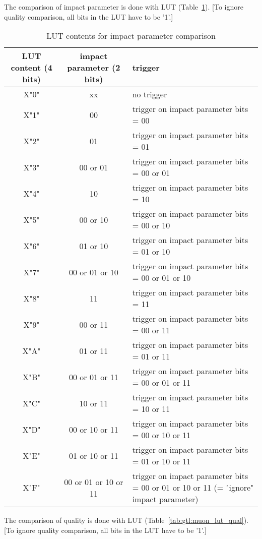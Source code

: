 The comparison of impact parameter is done with LUT (Table~\ref{tab:gtl:muon_lut_ip}). [To ignore quality comparison, all bits in the LUT have to be '1'.]

\begin{table}
\caption{LUT contents for impact parameter comparison}
\vspace{5mm}
\centering
\begin{tabular}{|c|c|p{}|}\hline
LUT content (4 bits) & impact parameter  (2 bits) & trigger \\\hline\hline
X"0" & xx & no trigger\\\hline
X"1" & 00 & trigger on impact parameter bits = 00\\\hline
X"2" & 01 & trigger on impact parameter bits = 01\\\hline
X"3" & 00 or 01 & trigger on impact parameter bits = 00 or 01\\\hline
X"4" & 10 & trigger on impact parameter bits = 10\\\hline
X"5" & 00 or 10 & trigger on impact parameter bits = 00 or 10\\\hline
X"6" & 01 or 10 & trigger on impact parameter bits = 01 or 10\\\hline
X"7" & 00 or 01 or 10 & trigger on impact parameter bits = 00 or 01 or 10\\\hline
X"8" & 11 & trigger on impact parameter bits = 11\\\hline
X"9" & 00 or 11 & trigger on impact parameter bits = 00 or 11\\\hline
X"A" & 01 or 11 & trigger on impact parameter bits = 01 or 11\\\hline
X"B" & 00 or 01 or 11 & trigger on impact parameter bits = 00 or 01 or 11\\\hline
X"C" & 10 or 11 & trigger on impact parameter bits = 10 or 11\\\hline
X"D" & 00 or 10 or 11 & trigger on impact parameter bits = 00 or 10 or 11\\\hline
X"E" & 01 or 10 or 11 & trigger on impact parameter bits = 01 or 10 or 11\\\hline
X"F" & 00 or 01 or 10 or 11 & trigger on impact parameter bits = 00 or 01 or 10 or 11 (= "ignore" impact parameter)\\\hline
\end{tabular}
\label{tab:gtl:muon_lut_ip}
\end{table}

The comparison of quality is done with LUT (Table~\ref{tab:gtl:muon_lut_qual}). [To ignore quality comparison, all bits in the LUT have to be '1'.]

